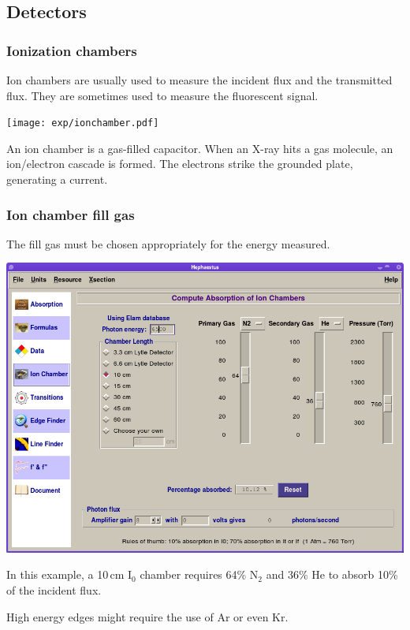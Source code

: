\documentclass[10pt, xcolor=x11names, compress]{beamer}
\begin{document}
\subsection{Detectors}

\begin{frame}
  \frametitle{Ionization chambers}
  
  Ion chambers are usually used to measure the incident flux and the
  transmitted flux.  They are sometimes used to measure the
  fluorescent signal.
  \begin{center}
    \texttt{[image: exp/ionchamber.pdf]}
  \end{center}
  An ion chamber is a gas-filled capacitor.  When an X-ray hits a gas
  molecule, an ion/electron cascade is formed.  The electrons strike
  the grounded plate, generating a current.
\end{frame}

\begin{frame}
  \frametitle{Ion chamber fill gas}
  
  The fill gas must be chosen appropriately for the energy measured.
  \begin{center}
    \includegraphics[width=0.6\linewidth]{exp/heph_ionchamber.png}
  \end{center}
  In this example, a 10\,cm I$_0$ chamber requires 64\% N$_2$ and 36\%
  He to absorb 10\% of the incident flux.

  \bigskip

  High energy edges might require the use of Ar or even Kr.
\end{frame}
\end{document}
